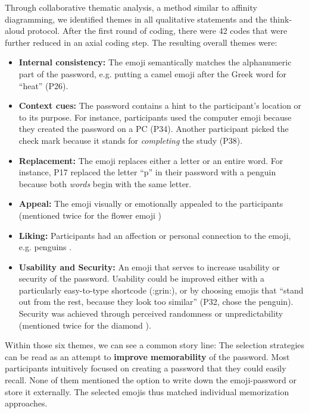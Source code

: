 Through collaborative thematic analysis, a method similar to affinity diagramming, we identified themes in all qualitative statements and the think-aloud protocol. After the first round of coding, there were 42 codes that were further reduced in an axial coding step. The resulting overall themes were:
\begin{itemize}[leftmargin=*]
	\item \textbf{Internal consistency:} The emoji semantically matches the alphanumeric part of the password, e.g. putting a camel emoji  after the Greek word for ``heat'' (P26). 
	\item \textbf{Context cues:} The password contains a hint to the participant's location or to its purpose. For instance, participants used the computer emoji  because they created the password on a PC (P34). Another participant picked the check mark  because it stands for \textit{completing} the study (P38). 
	\item \textbf{Replacement:} The emoji replaces either a letter or an entire word. For instance, P17 replaced the letter ``p'' in their password with a penguin  because both \textit{words} begin with the same letter.
	\item \textbf{Appeal:} The emoji visually or emotionally appealed to the participants (mentioned twice for the flower emoji )
	\item \textbf{Liking:} Participants had an affection or personal connection to the emoji, e.g. penguins .
	\item \textbf{Usability and Security:} An emoji that serves to increase usability or security of the password. Usability could be improved either with a particularly easy-to-type shortcode (:grin:), or by choosing emojis that ``stand out from the rest, because they look too similar'' (P32, chose the penguin). Security was achieved through perceived randomness or unpredictability (mentioned twice for the diamond ).
\end{itemize}

Within those six themes, we can see a common story line: The selection strategies can be read as an attempt to \textbf{improve memorability} of the password. Most participants intuitively focused on creating a password that they could easily recall. None of them mentioned the option to write down the emoji-password or store it externally. The selected emojis thus matched individual memorization approaches.

